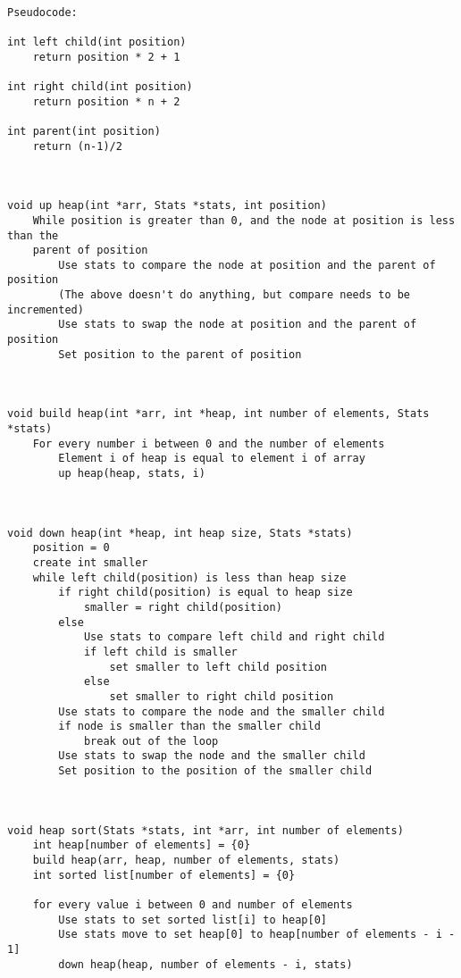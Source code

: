 \documentclass[11pt]{article}
\begin{document}
\begin{verbatim}

Pseudocode:

int left child(int position)
    return position * 2 + 1

int right child(int position)
    return position * n + 2

int parent(int position)
    return (n-1)/2



void up heap(int *arr, Stats *stats, int position)
    While position is greater than 0, and the node at position is less than the
    parent of position
        Use stats to compare the node at position and the parent of position
        (The above doesn't do anything, but compare needs to be incremented)
        Use stats to swap the node at position and the parent of position
        Set position to the parent of position



void build heap(int *arr, int *heap, int number of elements, Stats *stats)
    For every number i between 0 and the number of elements
        Element i of heap is equal to element i of array
        up heap(heap, stats, i)



void down heap(int *heap, int heap size, Stats *stats)
    position = 0
    create int smaller
    while left child(position) is less than heap size
        if right child(position) is equal to heap size
            smaller = right child(position)
        else
            Use stats to compare left child and right child
            if left child is smaller
                set smaller to left child position
            else
                set smaller to right child position
        Use stats to compare the node and the smaller child
        if node is smaller than the smaller child
            break out of the loop
        Use stats to swap the node and the smaller child
        Set position to the position of the smaller child



void heap sort(Stats *stats, int *arr, int number of elements)
    int heap[number of elements] = {0}
    build heap(arr, heap, number of elements, stats)
    int sorted list[number of elements] = {0}

    for every value i between 0 and number of elements
        Use stats to set sorted list[i] to heap[0]
        Use stats move to set heap[0] to heap[number of elements - i - 1]
        down heap(heap, number of elements - i, stats)
            

\end{verbatim}
\end{document}
